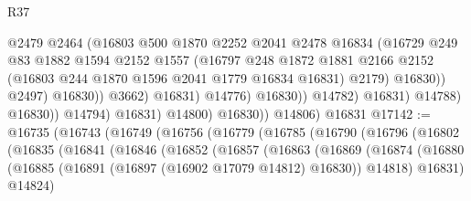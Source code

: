 \begin{lexlean}{R37}
\begin{coremodule}
                                          @2479
                                          @2464
                                          (@16803
                                            @500
                                            @1870
                                            @2252
                                            @2041
                                            @2478
                                            @16834
                                            (@16729
                                              @249
                                              @83
                                              @1882
                                              @1594
                                              @2152
                                              @1557
                                              (@16797
                                                @248
                                                @1872
                                                @1881
                                                @2166
                                                @2152
                                                (@16803 @244 @1870 @1596 @2041 @1779 @16834 @16831)
                                                @2179)
                                              @16830))
                                          @2497)
                                        @16830))
                                    @3662)
                                  @16831)
                                @14776)
                              @16830))
                          @14782)
                        @16831)
                      @14788)
                    @16830))
                @14794)
              @16831)
            @14800)
          @16830))
      @14806)
    @16831
@17142 := @16735
    (@16743
      (@16749
        (@16756
          (@16779
            (@16785
              (@16790
                (@16796
                  (@16802
                    (@16835
                      (@16841
                        (@16846
                          (@16852
                            (@16857
                              (@16863
                                (@16869
                                  (@16874
                                    (@16880
                                      (@16885
                                        (@16891 (@16897 (@16902 @17079 @14812) @16830))
                                        @14818)
                                      @16831)
                                    @14824)

\end{coremodule}
\end{lexlean}
